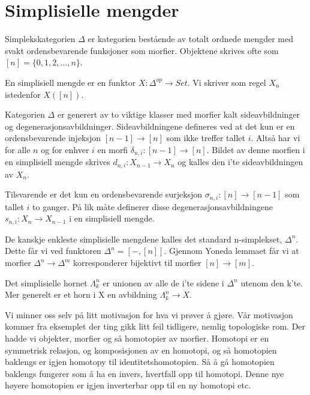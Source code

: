 \section{Simplisielle mengder}

\begin{definition}
    Simplekskategorien $\Delta$ er kategorien bestående av totalt ordnede mengder med svakt ordensbevarende funksjoner som morfier. Objektene skrives ofte som $[n]=\{ 0,1,2,\ldots, n\}$. 
\end{definition}

\begin{definition}
    En simplisiell mengde er en funktor $X:\Delta^{op}\longrightarrow Set$. Vi skriver som regel $X_n$ istedenfor $X([n])$.  
\end{definition}

Kategorien $\Delta$ er generert av to viktige klasser med morfier kalt sideavbildninger og degenerasjonsavbildninger. 
Sideavbildningene defineres ved at det kun er en ordensbevarende injeksjon $[n-1]\longrightarrow [n]$ som ikke treffer tallet $i$. 
Altså har vi for alle $n$ og for enhver $i$ en morfi $\delta_{n,i}:[n-1]\longrightarrow [n]$. 
Bildet av denne morfien i en simplisiell mengde skrives $d_{n,i}:X_{n-1}\longrightarrow X_n$ og kalles den i'te sideavbildningen av $X_n$. 

Tilsvarende er det kun en ordensbevarende surjeksjon $\sigma_{n,i}:[n]\longrightarrow [n-1]$ som tallet $i$ to ganger. 
På lik måte definerer disse degenerasjonsavbildningene $s_{n,i}:X_n\longrightarrow X_{n-1}$ i en simplisiell mengde. 

De kanskje enkleste simplisielle mengdene kalles det standard n-simplekset, $\Delta^n$. 
Dette får vi ved funktoren $\Delta^n=[-, [n]]$. 
Gjennom Yoneda lemmaet får vi at morfier $\Delta^n \longrightarrow \Delta^m$ korresponderer bijektivt til morfier $[n]\longrightarrow [m]$. 

\begin{definition}
    Det simplisielle hornet $\Lambda_k^n$ er unionen av alle de i'te sidene i $\Delta^n$ utenom den k'te. 
    Mer generelt er et horn i X en avbildning $\Lambda_k^n\longrightarrow X$. 
\end{definition}


Vi minner oss selv på litt motivasjon for hva vi prøver å gjøre. 
Vår motivasjon kommer fra eksemplet der ting gikk litt feil tidligere, nemlig topologiske rom. 
Der hadde vi objekter, morfier og så homotopier av morfier. 
Homotopi er en symmetrisk relasjon, og komposisjonen av en homotopi, og så homotopien baklengs er igjen homotopy til identitetshomotopien. 
Så å gå homotopien baklengs fungerer som å ha en invers, hvertfall opp til homotopi. Denne nye høyere homotopien er igjen inverterbar opp til en ny homotopi etc.

